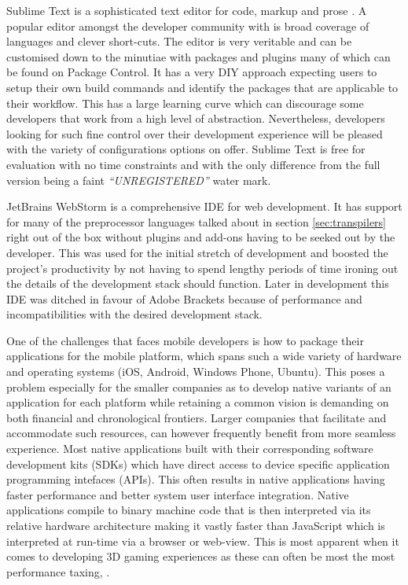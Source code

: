 \documentclass[final]{cmpreport}
\begin{document}

Sublime Text is a sophisticated text editor for code, markup and prose \footnotemark. A popular editor amongst the developer community with is broad coverage of languages and clever short-cuts. The editor is very veritable and can be customised down to the minutiae with packages and plugins many of which can be found on Package Control\footnotemark. It has a very DIY approach expecting users to setup their own build commands and identify the packages that are applicable to their workflow. This has a large learning curve which can discourage some developers that work from a high level of abstraction. Nevertheless, developers looking for such fine control over their development experience will be pleased with the variety of configurations options on offer. Sublime Text is free for evaluation with no time constraints and with the only difference from the full version being a faint \textit{``UNREGISTERED''} water mark.


JetBrains WebStorm is a comprehensive IDE for web development. It has support for many of the preprocessor languages talked about in section \ref{sec:transpilers} right out of the box without plugins and add-ons having to be seeked out by the developer. This was used for the initial stretch of development and boosted the project's productivity by not having to spend lengthy periods of time ironing out the details of the development stack should function. Later in development this IDE was ditched in favour of Adobe Brackets because of performance and incompatibilities with the desired development stack.

One of the challenges that faces mobile developers is how to package their applications for the mobile platform, which spans such a wide variety of hardware and operating systems (iOS\footnotemark, Android\footnotemark, Windows Phone\footnotemark, Ubuntu\footnotemark). This poses a problem especially for the smaller companies as to develop native variants of an application for each platform while retaining a common vision is demanding on both financial and chronological frontiers. Larger companies that facilitate and accommodate such resources, can however frequently benefit from more seamless experience. Most native applications built with their corresponding software development kits (SDKs) which have direct access to device specific application programming intefaces (APIs). This often results in native applications having faster performance and better system user interface integration. Native applications compile to binary machine code that is then interpreted via its relative hardware architecture making it vastly faster than JavaScript which is interpreted at run-time via a browser or web-view. This is most apparent when it comes to developing 3D gaming experiences as these can often be most the most performance taxing, \cite{Kulloli}.
\end{document}
